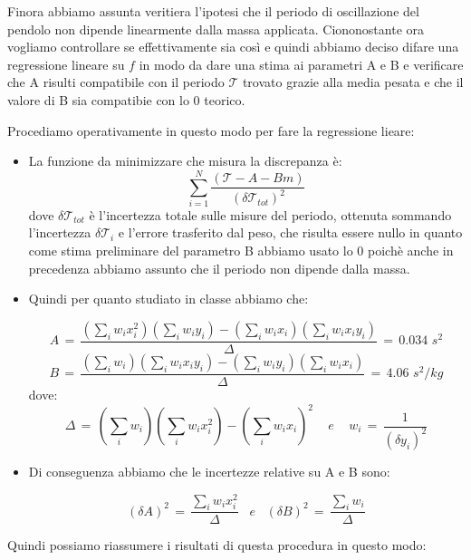 Finora abbiamo assunta veritiera l'ipotesi che il periodo di oscillazione del pendolo non dipende linearmente dalla massa applicata. Ciononostante ora vogliamo controllare se effettivamente sia così e quindi abbiamo deciso difare una regressione lineare su $f$ in modo da dare una stima ai parametri A e B e verificare che A risulti compatibile con il periodo $\mathcal{T}$ trovato grazie alla media pesata e che il valore di B sia compatibie con lo 0 teorico.

Procediamo operativamente in questo modo per fare la regressione lieare:

\begin{itemize}
	\item{La funzione da minimizzare che misura la discrepanza è:
			\begin{equation}
                \sum_{i=1}^{N} \frac{(\mathcal{T} - A - B m)}{(\delta \mathcal{T}_{tot})^2}	
                \label{eq:min_quad}
			\end{equation}
            dove $\delta \mathcal{T}_{tot}$ è l'incertezza totale sulle misure del periodo, ottenuta sommando l'incertezza $\delta \mathcal{T}_i$ e l'errore trasferito dal peso, che risulta essere nullo in quanto come stima preliminare del parametro B abbiamo usato lo 0 poichè anche in precedenza abbiamo assunto che il periodo non dipende dalla massa.}
\end{itemize}
\begin{itemize}
	\item{Quindi per quanto studiato in classe abbiamo che:

			\begin{equation*}
				A \,=\, \frac{(\sum_i w_i x_i^2)(\sum_i w_i y_i) - (\sum_i w_i x_i)(\sum_i w_i x_i y_i)}{\Delta} \,=\, 0.034 \,\, s^2
			\end{equation*}
			\begin{equation*}
				B \,=\, \frac{(\sum_i w_i)(\sum_i w_i x_i y_i) - (\sum_i w_i y_i)(\sum_i w_i x_i)}{\Delta} \,=\, 4.06 \,\, s^2 / kg
			\end{equation*}
			dove:
			\begin{equation*}
				\Delta \,=\, (\sum_i w_i)(\sum_i w_i x_i^2) - (\sum_i w_i x_i)^2 \,\,\,\,\,\,\, e \,\,\,\,\,\,\,
				w_i \,=\, \frac{1}{(\delta y_i)^2}
			\end{equation*}}
	\item{Di conseguenza abbiamo che le incertezze relative su A e B sono:

			\begin{equation*}
				(\delta A)^2 \,=\, \frac{\sum_i w_i x_i^2}{\Delta}  \,\,\,\,\, e \,\,\,\,\,
				(\delta B)^2 \,=\, \frac{\sum_i w_i}{\Delta} 
			\end{equation*}}
	\end{itemize} 
	Quindi possiamo riassumere i risultati di questa procedura in questo modo:

